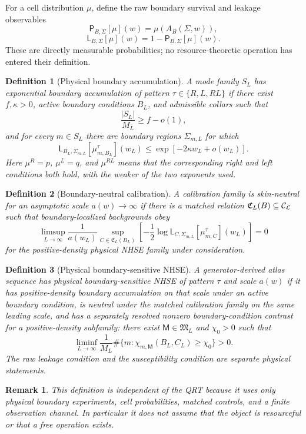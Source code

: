 \documentclass[11pt]{article}
\newtheorem{definition}{Definition}
\newtheorem{remark}{Remark}
\begin{document}
For a cell distribution \(\mu\), define the raw boundary survival and leakage observables
\[
\mathsf P_{B,\Sigma}[\mu](w)=\mu(A_B(\Sigma,w)),
\]
\[
\mathsf L_{B,\Sigma}[\mu](w)=1-\mathsf P_{B,\Sigma}[\mu](w).
\]
These are directly measurable probabilities; no resource-theoretic operation has entered their definition.

\begin{definition}[Physical boundary accumulation]
A mode family \(S_L\) has exponential boundary accumulation of pattern \(\tau\in\{R,L,RL\}\) if there exist \(f,\kappa>0\), active boundary conditions \(B_L\), and admissible collars such that
\[
\frac{|S_L|}{M_L}\ge f-o(1),
\]
and for every \(m\in S_L\) there are boundary regions \(\Sigma_{m,L}\) for which
\[
\mathsf L_{B_L,\Sigma_{m,L}}[\mu_{m,B_L}^{\tau}](w_L)
\le
\exp[-2\kappa w_L+o(w_L)].
\]
Here \(\mu^R=p\), \(\mu^L=q\), and \(\mu^{RL}\) means that the corresponding right and left conditions both hold, with the weaker of the two exponents used.
\end{definition}

\begin{definition}[Boundary-neutral calibration]
A calibration family is skin-neutral for an asymptotic scale \(a(w)\to\infty\) if there is a matched relation \(\mathfrak C_L(B)\subseteq\cal C_L\) such that boundary-localized backgrounds obey
\[
\limsup_{L\to\infty}
\frac{1}{a(w_L)}
\sup_{C\in\mathfrak C_L(B_L)}
\left[-\frac12\log
\mathsf L_{C,\Sigma_{m,L}}[\mu_{m,C}^{\tau}](w_L)\right]
=0
\]
for the positive-density physical NHSE family under consideration.
\end{definition}

\begin{definition}[Physical boundary-sensitive NHSE]
A generator-derived atlas sequence has physical boundary-sensitive NHSE of pattern \(\tau\) and scale \(a(w)\) if it has positive-density boundary accumulation on that scale under an active boundary condition, is neutral under the matched calibration family on the same leading scale, and has a separately resolved nonzero boundary-condition contrast for a positive-density subfamily: there exist \(\mathsf M\in\mathfrak M_L\) and \(\chi_0>0\) such that
\[
\liminf_{L\to\infty}
\frac1{M_L}
\#\{m:\chi_{m,\mathsf M}(B_L,C_L)\ge\chi_0\}>0.
\]
The raw leakage condition and the susceptibility condition are separate physical statements.
\end{definition}

\begin{remark}
This definition is independent of the QRT because it uses only physical boundary experiments, cell probabilities, matched controls, and a finite observation channel. In particular it does not assume that the object is resourceful or that a free operation exists.
\end{remark}
\end{document}
